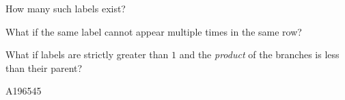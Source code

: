 \documentclass{article}
\begin{document}
\begin{question}
  How many such labels exist?
\end{question}
\begin{related}
  \item What if the same label cannot appear multiple times in the same row?
  \item What if labels are strictly greater than $1$ and the \textit{product} of
    the branches is less than their parent?
\end{related}
\begin{references}
  \item A196545
\end{references}
\end{document}
